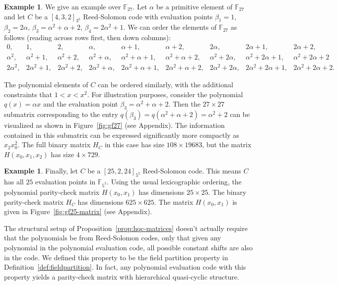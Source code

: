 \documentclass[11pt]{amsart}
\theoremstyle{definition}
\newtheorem{example}[theorem]{Example}
\newcommand{\0}{\mathbf{0}}
\newcommand{\F}{\mathbb{F}}
\begin{document}
\begin{example} \label{ex:gf27}
    We give an example over $\F_{27}$. Let $\alpha$ be a primitive element of $\F_{27}$ and let $C$ be a $[4,3,2]_{3^3}$ Reed-Solomon code with evaluation points $\beta_1=1$, $\beta_2=2\alpha$, $\beta_3=\alpha^2+\alpha+2$, $\beta_4=2\alpha^2+1$. We can order the elements of $\F_{27}$ as follows (reading across rows first, then down columns):
    {\footnotesize
    \[
    \begin{array}{ccccccccc}
        0, & 1, & 2, & \alpha, & \alpha+1, & \alpha+2, & 2\alpha, & 2\alpha+1, & 2\alpha+2, \\
        \alpha^2, & \alpha^2+1, & \alpha^2+2, & \alpha^2+\alpha, & \alpha^2+\alpha+1, & \alpha^2+\alpha+2, & \alpha^2+2\alpha, & \alpha^2+2\alpha+1, & \alpha^2+2\alpha+2 \\
        2\alpha^2, & 2 \alpha^2+1, & 2\alpha^2+2, & 2\alpha^2+\alpha, & 2\alpha^2+\alpha+1, & 2 \alpha^2+\alpha+2, & 2 \alpha^2+2\alpha, & 2 \alpha^2+2\alpha+1, & 2\alpha^2+2\alpha+2.
    \end{array}
    \]}
    
    The polynomial elements of $C$ can be ordered similarly, with the additional constraints that $1<x<x^2$. For illustration purposes, consider the polynomial $q(x) = \alpha x$ and the evaluation point $\beta_3=\alpha^2+\alpha+2$. Then the $27 \times 27$ submatrix corresponding to the entry $q(\beta_3)=q(\alpha^2+\alpha+2)=\alpha^2+2$ can be visualized as shown in Figure~\ref{fig:gf27} (see Appendix). The information contained in this submatrix can be expressed significantly more compactly as $x_2 x_0^2$. The full binary matrix $H_C$ in this case has size $108 \times 19683$, but the matrix $H(x_0,x_1,x_2)$ has size $4 \times 729$.
\end{example}

\begin{example}
    Finally, let $C$ be a $[25,2,24]_{5^2}$ Reed-Solomon code. This means $C$ has all $25$ evaluation points in $\F_{5^2}$. Using the usual lexicographic ordering, the polynomial parity-check matrix $H(x_0,x_1)$ has dimensions $25 \times 25$. The binary parity-check matrix $H_C$ has dimensions $625 \times 625$. The matrix $H(x_0,x_1)$ is given in Figure~\ref{fig:gf25-matrix} (see Appendix).
\end{example}

The structural setup of Proposition~\ref{prop:hqc-matrices} doesn't actually require that the polynomials be from Reed-Solomon codes, only that given any polynomial in the polynomial evaluation code, all possible constant shifts are also in the code. We defined this property to be the field partition property in Definition~\ref{def:fieldpartition}. In fact, any polynomial evaluation code with this property yields a parity-check matrix with hierarchical quasi-cyclic structure.
\end{document}
